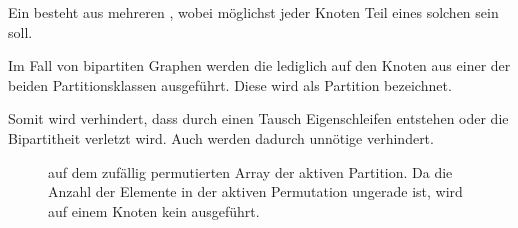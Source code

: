 %
%
%

Ein  besteht aus mehreren , wobei möglichst 
jeder Knoten Teil eines solchen  sein soll. 





Im Fall von bipartiten Graphen werden die  lediglich auf den Knoten 
aus einer der beiden Partitionsklassen ausgeführt. Diese wird als  Partition
bezeichnet. 


Somit wird verhindert, dass durch einen \gc{} Tausch Eigenschleifen entstehen oder
die Bipartitheit verletzt wird. Auch werden dadurch unnötige  verhindert.









%
%
% 
\begin{figure}[H]
\centering
  \caption{\gc{} auf dem zufällig permutierten Array der aktiven Partition. Da die Anzahl der Elemente in
  der aktiven Permutation ungerade ist, wird auf einem Knoten kein \ct{} ausgeführt.}
  \label{fig:global_curveball_trade_vector}
  
\end{figure}
%
%
%

